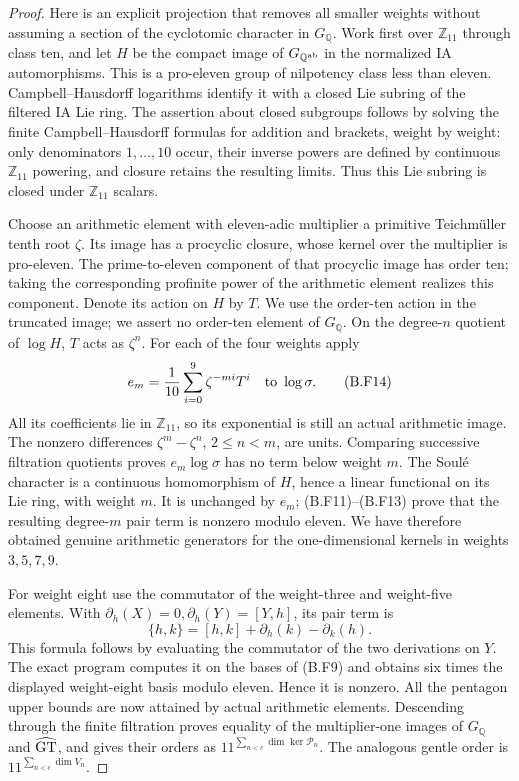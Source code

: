 \begin{proof}
Here is an explicit projection that removes all smaller
weights without assuming a section of the cyclotomic
character in $G_{\mathbb Q}$. Work first over
$\mathbb Z_{11}$ through class ten, and let $H$ be the
compact image of $G_{\mathbb Q^{\rm ab}}$ in the normalized
IA automorphisms. This is a pro-eleven group of nilpotency
class less than eleven. Campbell--Hausdorff logarithms
identify it with a closed Lie subring of the filtered
IA Lie ring. The assertion about closed subgroups follows
by solving the finite Campbell--Hausdorff formulas for
addition and brackets, weight by weight: only denominators
$1,\ldots,10$ occur, their inverse powers are defined by
continuous $\mathbb Z_{11}$ powering, and closure retains
the resulting limits. Thus this Lie subring is closed
under $\mathbb Z_{11}$ scalars.

Choose an arithmetic element with eleven-adic multiplier
a primitive Teichm\"uller tenth root $\zeta$. Its image
has a procyclic closure, whose kernel over the multiplier
is pro-eleven. The prime-to-eleven component of that
procyclic image has order ten; taking the corresponding
profinite power of the arithmetic element realizes this
component. Denote its action on $H$ by $T$. We use the
order-ten action in the truncated image; we assert no
order-ten element of $G_{\mathbb Q}$. On the degree-$n$
quotient of $\log H$, $T$ acts as $\zeta^n$.
For each of the four weights apply
\[
       e_m=\frac1{10}\sum_{i=0}^9\zeta^{-mi}T^i
             \quad\hbox{to }\log\sigma.                 \tag{B.F14}
\]
All its coefficients lie in $\mathbb Z_{11}$, so its
exponential is still an actual arithmetic image. The
nonzero differences $\zeta^m-\zeta^n$, $2\le n<m$, are
units. Comparing successive filtration quotients proves
$e_m\log\sigma$ has no term below weight $m$. The
Soul\'e character is a continuous homomorphism of $H$,
hence a linear functional on its Lie ring, with weight
$m$. It is unchanged by $e_m$; (B.F11)--(B.F13) prove
that the resulting degree-$m$ pair term is nonzero
modulo eleven. We have therefore obtained genuine
arithmetic generators for the one-dimensional kernels
in weights $3,5,7,9$.

For weight eight use the commutator of the weight-three
and weight-five elements. With
$\partial_h(X)=0,\partial_h(Y)=[Y,h]$, its pair term is
\[
        \{h,k\}=[h,k]+\partial_h(k)-\partial_k(h).
                                                               \tag{B.F15}
\]
This formula follows by evaluating the commutator of the
two derivations on $Y$. The exact program computes it
on the bases of (B.F9) and obtains six times the displayed
weight-eight basis modulo eleven. Hence it is nonzero.
All the pentagon upper bounds are now attained by actual
arithmetic elements. Descending through the finite
filtration proves equality of the multiplier-one images
of $G_{\mathbb Q}$ and $\widehat{\mathrm{GT}}$, and gives their orders as
$11^{\sum_{n<c}\dim\ker\mathcal P_n}$. The analogous
gentle order is $11^{\sum_{n<c}\dim V_n}$.


\end{proof}

